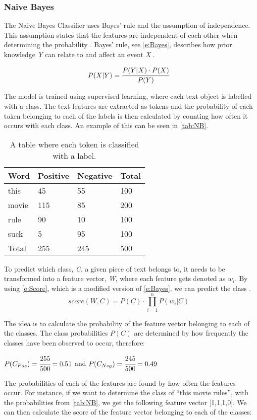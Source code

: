 \subsubsection{Naive Bayes} 
The Naive Bayes Classifier uses Bayes' rule and the assumption of independence.
This assumption states that the features are independent of each other when
determining the probability \citep[Proposition 6.5]{MIBook}. Bayes' rule, see
\autoref{e:Bayes}, describes how prior knowledge \textit{Y} can relate to and
affect an event \textit{X} \citep[p. 229]{MIBook}.

\begin{equation}\label{e:Bayes}
P(X|Y) = \cfrac{P(Y|X) \cdot P(X)}{P(Y)}
\end{equation}


The model is trained using supervised learning, where each text object is
labelled with a class. The text features are extracted as tokens and the
probability of each token belonging to each of the labels is then calculated by
counting how often it occurs with each class. An example of this can be seen in
\autoref{tab:NB}.

\begin{table}[H]
\centering
\begin{tabular}{|l|l|l|l|}
\hline
Word & Positive & Negative & Total 	\\ \hline
this & 45 & 55 & 100				\\ \hline
movie & 115 & 85 & 200				\\ \hline
rule & 90 & 10 & 100				\\ \hline
suck & 5 & 95 & 100					\\ \hline
Total & 255 & 245 & 500				\\ \hline
\end{tabular}
\caption{A table where each token is classified with a label.}
\label{tab:NB}
\end{table}

To predict which class, \textit{C}, a given piece of text belongs to, it needs
to be transformed into a feature vector, \textit{W}, where each feature gets
denoted as $w_{i}$. By using \autoref{e:Score}, which is a modified version of
\autoref{e:Bayes}, we can predict the class \citep[Ch.2.1]{Bayes}.
\begin{equation}\label{e:Score} score(W,C) = P(C) \cdot
\displaystyle\prod_{i=1}^{n}P(w_{i}|C)
\end{equation}

The idea is to calculate the probability of the feature vector belonging to each
of the classes. The class probabilities $P(C)$ are determined by how frequently
the classes have been observed to occur, therefore:
\begin{center}
$P(C_{Pos}) = \cfrac{255}{500} = 0.51 $ and $P(C_{Neg}) = \cfrac{245}{500} =
0.49 $
\end{center}
The probabilities of each of the features are found by how often the
features occur. For instance, if we want to determine the class of ``this
movie rules'', with the probabilities from \autoref{tab:NB}, we get the
following feature vector [1,1,1,0]. We can then calculate the score of
the feature vector belonging to each of the classes:

